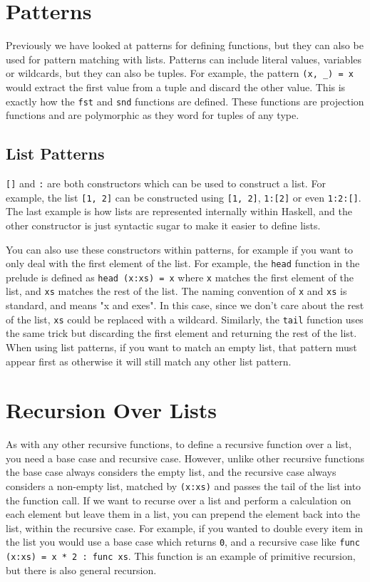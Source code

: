 
\section*{Patterns}

Previously we have looked at patterns for defining functions, but they can also be used for pattern matching with lists.
Patterns can include literal values, variables or wildcards, but they can also be tuples. For example, the pattern
 \verb`(x, _) = x` would extract the first value from a tuple and discard the other value. This is exactly how the
 \verb`fst` and \verb`snd` functions are defined. These functions are projection functions and are polymorphic as they
 word for tuples of any type.

\subsection*{List Patterns}

\verb`[]` and \verb`:` are both constructors which can be used to construct a list. For example, the list \verb`[1, 2]`
 can be constructed using \verb`[1, 2]`, \verb`1:[2]` or even \verb`1:2:[]`. The last example is how lists are
 represented internally within Haskell, and the other constructor is just syntactic sugar to make it easier to define
 lists.

You can also use these constructors within patterns, for example if you want to only deal with the first element of
 the list. For example, the \verb`head` function in the prelude is defined as \verb`head (x:xs) = x` where \verb`x`
 matches the first element of the list, and \verb`xs` matches the rest of the list. The naming convention of \verb`x`
 and \verb`xs` is standard, and means "x and exes". In this case, since we don't care about the rest of the list,
 \verb`xs` could be replaced with a wildcard. Similarly, the \verb`tail` function uses the same trick but discarding
 the first element and returning the rest of the list. When using list patterns, if you want to match an empty list,
 that pattern must appear first as otherwise it will still match any other list pattern.

\section*{Recursion Over Lists}

As with any other recursive functions, to define a recursive function over a list, you need a base case and recursive
 case. However, unlike other recursive functions the base case always considers the empty list, and the recursive case
 always considers a non-empty list, matched by \verb`(x:xs)` and passes the tail of the list into the function call.
 If we want to recurse over a list and perform a calculation on each element but leave them in a list, you can prepend
 the element back into the list, within the recursive case. For example, if you wanted to double every item in the list
 you would use a base case which returns \verb`0`, and a recursive case like \verb`func (x:xs) = x * 2 : func xs`. This
 function is an example of primitive recursion, but there is also general recursion.

